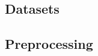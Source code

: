 \documentclass[./../../paper.tex]{subfiles}
\begin{document}
\subsection{Datasets}
\label{sec:dataset_description}

\subsection{Preprocessing}
\label{sec:preprocessing}
\end{document}
